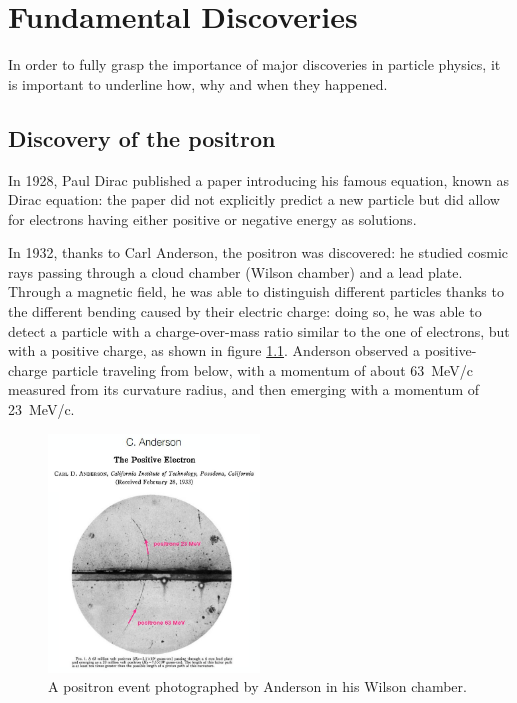 \chapter{Fundamental Discoveries}
\label{Discoveries-I}
In order to fully grasp the importance of major discoveries in particle physics, it is important to underline how, why and when they happened.

\section{Discovery of the positron}

In 1928, Paul Dirac published a paper introducing his famous equation, known as Dirac equation: the paper did not explicitly predict a new particle but did allow for electrons having either positive or negative energy as solutions. 
\vspace{2mm}

In 1932, thanks to Carl Anderson, the positron was discovered: he studied cosmic rays passing through a cloud chamber (Wilson chamber) and a lead plate. Through a magnetic field, he was able to distinguish different particles thanks to the different bending caused by their electric charge: doing so, he was able to detect a particle with a charge-over-mass ratio similar to the one of electrons, but with a positive charge, as shown in figure \ref{fig:positron}. Anderson observed a positive-charge particle traveling from below, with a momentum of about \SI{63}{MeV/c} measured from its curvature radius, and then emerging with a momentum of \SI{23}{MeV/c}.

\begin{figure}[h!]
    \centering
    \includegraphics[width=0.5\textwidth]{Figures/FNSN16_1.JPG}
    \caption{A positron event photographed by Anderson in his Wilson chamber.}
    \label{fig:positron}
\end{figure}

